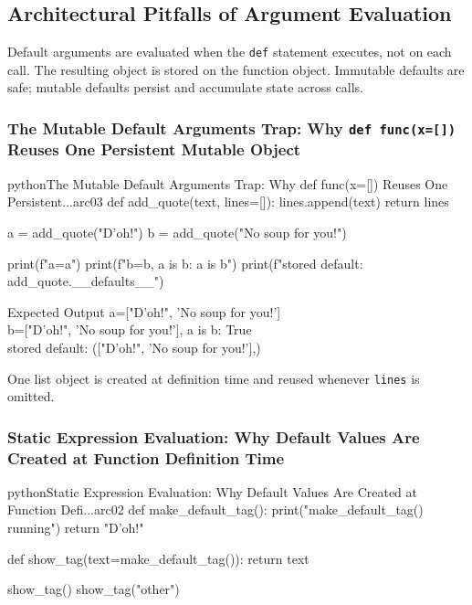 \subsection{Architectural Pitfalls of Argument Evaluation}

Default arguments are evaluated when the \texttt{def} statement executes, not on each call. The resulting object is stored on the function object. Immutable defaults are safe; mutable defaults persist and accumulate state across calls.

\subsubsection{The Mutable Default Arguments Trap: Why \texttt{def func(x=[])} Reuses One Persistent Mutable Object}

\begin{codebox}[]{python}{The Mutable Default Arguments Trap: Why def func(x=[]) Reuses One Persistent...}{arc03}
def add_quote(text, lines=[]):
    lines.append(text)
    return lines

a = add_quote("D'oh!")
b = add_quote("No soup for you!")

print(f"a={a}")
print(f"b={b}, a is b: {a is b}")
print(f"stored default: {add_quote.__defaults__}")
\end{codebox}


\begin{iobox}{Expected Output}
a=["D'oh!", 'No soup for you!'] \\
b=["D'oh!", 'No soup for you!'], a is b: True \\
stored default: (["D'oh!", 'No soup for you!'],) \\
\end{iobox}




One list object is created at definition time and reused whenever \texttt{lines} is omitted.

\subsubsection{Static Expression Evaluation: Why Default Values Are Created at Function Definition Time}

\begin{codebox}[]{python}{Static Expression Evaluation: Why Default Values Are Created at Function Defi...}{arc02}
def make_default_tag():
    print("make_default_tag() running")
    return "D'oh!"

def show_tag(text=make_default_tag()):
    return text

show_tag()
show_tag("other")
\end{codebox}


